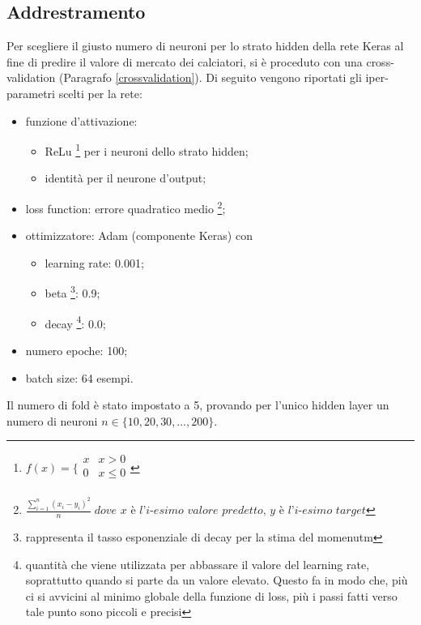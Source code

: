 \documentclass[12pt]{report}
\begin{document}
\subsection{Addrestramento}\label{relu}
Per scegliere il giusto numero di neuroni per lo strato hidden della rete Keras al fine di predire il valore di mercato dei calciatori, si è proceduto con una cross-validation (Paragrafo \ref{crossvalidation}). Di seguito vengono riportati gli iper-parametri scelti per la rete:
\begin{itemize}
\item{funzione d’attivazione}:

\begin{itemize}
\item{ReLu 
\footnote{$f(x) =
\bigg \{
\begin{array}{rl}
x & x > 0 \\
0 & x \leq 0 \\
\end{array}
$
} per i neuroni dello strato hidden};
\item{identità per il neurone d'output};
\end{itemize}

\item{loss function}: errore quadratico medio \footnote{
$\displaystyle{\frac{\sum_{i=1}^n \left(x_i - y_i\right)^2}{n}} \; \textit{dove x è l'i-esimo valore predetto, y è l'i-esimo target}$
};

\item{ottimizzatore}: Adam (componente Keras) con

\begin{itemize}
\item{learning rate}: 0.001;
\item{beta \footnote{rappresenta il tasso esponenziale di decay per la stima del momenutm}}: 0.9;
\item{decay \footnote{quantità che viene utilizzata per abbassare il valore del learning rate, soprattutto quando si parte da un valore elevato. Questo fa in modo che, più ci si avvicini al minimo globale della funzione di loss, più i passi fatti verso tale punto sono piccoli e precisi}}: 0.0;
\end{itemize}

\item{numero epoche}: 100;

\item{batch size}: 64 esempi.
\end{itemize}

Il numero di fold è stato impostato a 5, provando per l'unico hidden layer un numero di neuroni $n \in \{10, 20, 30, \dots, 200\}$.
\end{document}
